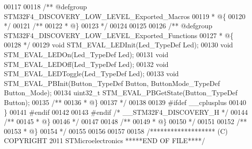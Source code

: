 \begin{DoxyCode}
00117 
00118 \textcolor{comment}{/** @defgroup STM32F4\_DISCOVERY\_LOW\_LEVEL\_Exported\_Macros}
00119 \textcolor{comment}{  * @\{}
00120 \textcolor{comment}{  */}
00121 \textcolor{comment}{/**}
00122 \textcolor{comment}{  * @\}}
00123 \textcolor{comment}{  */}
00124 
00125 
00126 \textcolor{comment}{/** @defgroup STM32F4\_DISCOVERY\_LOW\_LEVEL\_Exported\_Functions}
00127 \textcolor{comment}{  * @\{}
00128 \textcolor{comment}{  */}
00129 \textcolor{keywordtype}{void} STM_EVAL_LEDInit(Led\_TypeDef Led);
00130 \textcolor{keywordtype}{void} STM_EVAL_LEDOn(Led\_TypeDef Led);
00131 \textcolor{keywordtype}{void} STM_EVAL_LEDOff(Led\_TypeDef Led);
00132 \textcolor{keywordtype}{void} STM_EVAL_LEDToggle(Led\_TypeDef Led);
00133 \textcolor{keywordtype}{void} STM_EVAL_PBInit(Button\_TypeDef Button, ButtonMode\_TypeDef Button\_Mode);
00134 uint32\_t STM_EVAL_PBGetState(Button\_TypeDef Button);
00135 \textcolor{comment}{/**}
00136 \textcolor{comment}{  * @\}}
00137 \textcolor{comment}{  */}
00138 
00139 \textcolor{preprocessor}{#}\textcolor{preprocessor}{ifdef} \_\_cplusplus
00140 \}
00141 \textcolor{preprocessor}{#}\textcolor{preprocessor}{endif}
00142 
00143 \textcolor{preprocessor}{#}\textcolor{preprocessor}{endif} \textcolor{comment}{/* \_\_STM32F4\_DISCOVERY\_H */}
00144 \textcolor{comment}{/**}
00145 \textcolor{comment}{  * @\}}
00146 \textcolor{comment}{  */}
00147 
00148 \textcolor{comment}{/**}
00149 \textcolor{comment}{  * @\}}
00150 \textcolor{comment}{  */}
00151 
00152 \textcolor{comment}{/**}
00153 \textcolor{comment}{  * @\}}
00154 \textcolor{comment}{  */}
00155 
00156 
00157 
00158 \textcolor{comment}{/******************* (C) COPYRIGHT 2011 STMicroelectronics *****END OF FILE****/}
\end{DoxyCode}
